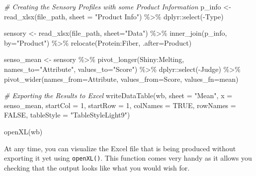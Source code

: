 \documentclass[
]{book}
\newenvironment{Shaded}{\begin{snugshade}}{\end{snugshade}}
\newcommand{\AttributeTok}[1]{\textcolor[rgb]{0.77,0.63,0.00}{#1}}
\newcommand{\CommentTok}[1]{\textcolor[rgb]{0.56,0.35,0.01}{\textit{#1}}}
\newcommand{\ConstantTok}[1]{\textcolor[rgb]{0.00,0.00,0.00}{#1}}
\newcommand{\DecValTok}[1]{\textcolor[rgb]{0.00,0.00,0.81}{#1}}
\newcommand{\FunctionTok}[1]{\textcolor[rgb]{0.00,0.00,0.00}{#1}}
\newcommand{\NormalTok}[1]{#1}
\newcommand{\OtherTok}[1]{\textcolor[rgb]{0.56,0.35,0.01}{#1}}
\newcommand{\SpecialCharTok}[1]{\textcolor[rgb]{0.00,0.00,0.00}{#1}}
\newcommand{\StringTok}[1]{\textcolor[rgb]{0.31,0.60,0.02}{#1}}
\begin{document}
\begin{Shaded}
\begin{Highlighting}[]
\CommentTok{\# Creating the Sensory Profiles with some Product Information}
\NormalTok{p\_info }\OtherTok{\textless{}{-}} \FunctionTok{read\_xlsx}\NormalTok{(file\_path, }\AttributeTok{sheet =} \StringTok{"Product Info"}\NormalTok{) }\SpecialCharTok{\%\textgreater{}\%} 
\NormalTok{  dplyr}\SpecialCharTok{::}\FunctionTok{select}\NormalTok{(}\SpecialCharTok{{-}}\NormalTok{Type)}

\NormalTok{sensory }\OtherTok{\textless{}{-}} \FunctionTok{read\_xlsx}\NormalTok{(file\_path, }\AttributeTok{sheet=}\StringTok{"Data"}\NormalTok{) }\SpecialCharTok{\%\textgreater{}\%} 
  \FunctionTok{inner\_join}\NormalTok{(p\_info, }\AttributeTok{by=}\StringTok{"Product"}\NormalTok{) }\SpecialCharTok{\%\textgreater{}\%} 
  \FunctionTok{relocate}\NormalTok{(Protein}\SpecialCharTok{:}\NormalTok{Fiber, }\AttributeTok{.after=}\NormalTok{Product)}

\NormalTok{senso\_mean }\OtherTok{\textless{}{-}}\NormalTok{ sensory }\SpecialCharTok{\%\textgreater{}\%} 
  \FunctionTok{pivot\_longer}\NormalTok{(Shiny}\SpecialCharTok{:}\NormalTok{Melting, }\AttributeTok{names\_to=}\StringTok{"Attribute"}\NormalTok{, }\AttributeTok{values\_to=}\StringTok{"Score"}\NormalTok{) }\SpecialCharTok{\%\textgreater{}\%} 
\NormalTok{  dplyr}\SpecialCharTok{::}\FunctionTok{select}\NormalTok{(}\SpecialCharTok{{-}}\NormalTok{Judge) }\SpecialCharTok{\%\textgreater{}\%} 
  \FunctionTok{pivot\_wider}\NormalTok{(}\AttributeTok{names\_from=}\NormalTok{Attribute, }\AttributeTok{values\_from=}\NormalTok{Score, }\AttributeTok{values\_fn=}\NormalTok{mean)}


\CommentTok{\# Exporting the Results to Excel}
\FunctionTok{writeDataTable}\NormalTok{(wb,}
               \AttributeTok{sheet =} \StringTok{"Mean"}\NormalTok{,}
               \AttributeTok{x =}\NormalTok{ senso\_mean, }
               \AttributeTok{startCol =} \DecValTok{1}\NormalTok{,}
               \AttributeTok{startRow =} \DecValTok{1}\NormalTok{,}
               \AttributeTok{colNames =} \ConstantTok{TRUE}\NormalTok{, }\AttributeTok{rowNames =} \ConstantTok{FALSE}\NormalTok{, }
               \AttributeTok{tableStyle =} \StringTok{"TableStyleLight9"}\NormalTok{)}

\FunctionTok{openXL}\NormalTok{(wb)}
\end{Highlighting}
\end{Shaded}

At any time, you can visualize the Excel file that is being produced without exporting it yet using \texttt{openXL()}. This function comes very handy as it allows you checking that the output looks like what you would wish for.
\end{document}
